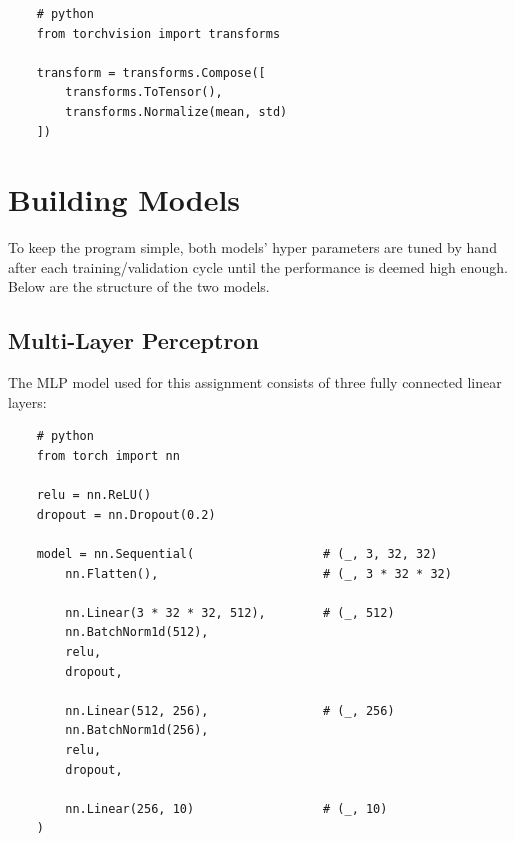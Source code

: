 \documentclass{report}
\begin{document}
\newpage
\begin{verbatim}
    # python
    from torchvision import transforms

    transform = transforms.Compose([
        transforms.ToTensor(),
        transforms.Normalize(mean, std)
    ])
\end{verbatim}

\section{Building Models}
To keep the program simple, both models' hyper parameters are tuned by hand after each training/validation 
cycle until the performance is deemed high enough. Below are the structure of the two models.

\subsection{Multi-Layer Perceptron}
The MLP model used for this assignment consists of three fully connected linear layers:

\begin{verbatim}
    # python
    from torch import nn

    relu = nn.ReLU()
    dropout = nn.Dropout(0.2)
    
    model = nn.Sequential(                  # (_, 3, 32, 32)
        nn.Flatten(),                       # (_, 3 * 32 * 32)

        nn.Linear(3 * 32 * 32, 512),        # (_, 512)
        nn.BatchNorm1d(512),
        relu,
        dropout,

        nn.Linear(512, 256),                # (_, 256)
        nn.BatchNorm1d(256),
        relu,
        dropout,

        nn.Linear(256, 10)                  # (_, 10)
    )
\end{verbatim}
\end{document}
